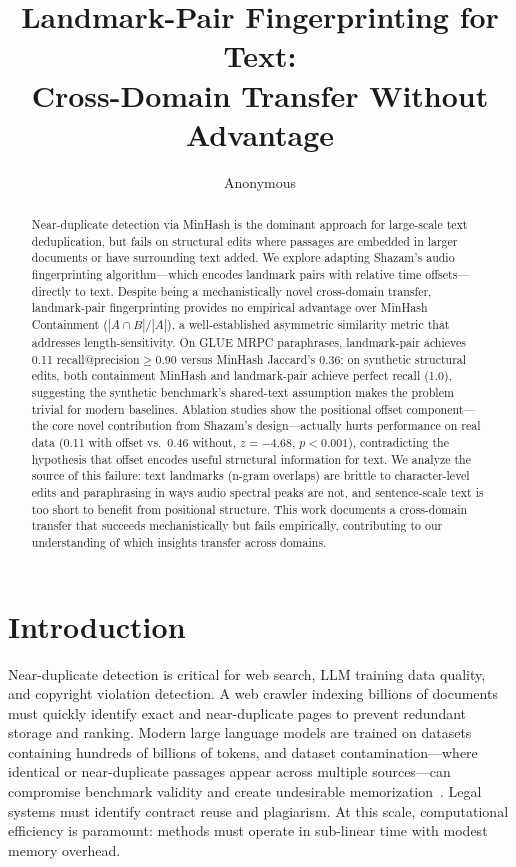 \documentclass[11pt,letterpaper]{article}
\title{\textbf{Landmark-Pair Fingerprinting for Text:\\Cross-Domain Transfer Without Advantage}}
\author{Anonymous}
\date{}
\begin{document}
\maketitle

\begin{abstract}
Near-duplicate detection via MinHash is the dominant approach for large-scale text deduplication, but fails on structural edits where passages are embedded in larger documents or have surrounding text added. We explore adapting Shazam's audio fingerprinting algorithm---which encodes landmark pairs with relative time offsets---directly to text. Despite being a mechanistically novel cross-domain transfer, landmark-pair fingerprinting provides no empirical advantage over MinHash Containment ($|A \cap B|/|A|$), a well-established asymmetric similarity metric that addresses length-sensitivity. On GLUE MRPC paraphrases, landmark-pair achieves 0.11 recall@precision$\geq$0.90 versus MinHash Jaccard's 0.36; on synthetic structural edits, both containment MinHash and landmark-pair achieve perfect recall (1.0), suggesting the synthetic benchmark's shared-text assumption makes the problem trivial for modern baselines. Ablation studies show the positional offset component---the core novel contribution from Shazam's design---actually hurts performance on real data (0.11 with offset vs.\ 0.46 without, $z=-4.68$, $p<0.001$), contradicting the hypothesis that offset encodes useful structural information for text. We analyze the source of this failure: text landmarks (n-gram overlaps) are brittle to character-level edits and paraphrasing in ways audio spectral peaks are not, and sentence-scale text is too short to benefit from positional structure. This work documents a cross-domain transfer that succeeds mechanistically but fails empirically, contributing to our understanding of which insights transfer across domains.
\end{abstract}

\section{Introduction}

Near-duplicate detection is critical for web search, LLM training data quality, and copyright violation detection. A web crawler indexing billions of documents must quickly identify exact and near-duplicate pages to prevent redundant storage and ranking. Modern large language models are trained on datasets containing hundreds of billions of tokens, and dataset contamination---where identical or near-duplicate passages appear across multiple sources---can compromise benchmark validity and create undesirable memorization~\citep{Lee2022}. Legal systems must identify contract reuse and plagiarism. At this scale, computational efficiency is paramount: methods must operate in sub-linear time with modest memory overhead.
\end{document}
